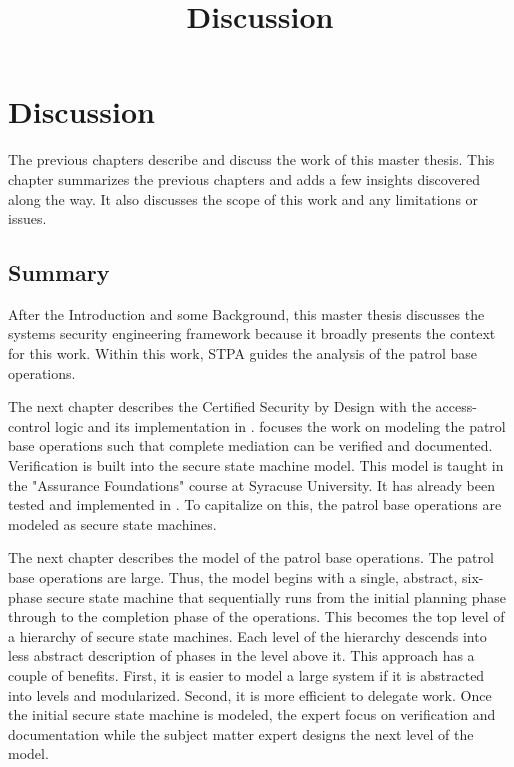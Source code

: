 \documentclass[../../main/main.tex]{subfiles}
\begin{document}
\title{Discussion}

\chapter{Discussion}\label{chp:discussion}

The previous chapters describe and discuss the work of this master thesis. This chapter summarizes the previous chapters and adds a few insights discovered along the way.  It also discusses the scope of this work and any limitations or issues.  

\section{Summary}\label{recap}
After the Introduction and some Background, this master thesis discusses the systems security engineering framework because it broadly presents the context for this work.  Within this work, STPA guides the analysis of the patrol base operations.

The next chapter describes the Certified Security by Design with the access-control logic and its implementation in .   focuses the work on modeling the patrol base operations such that complete mediation can be verified and documented.  Verification is built into the secure state machine model.  This model is taught in the "Assurance Foundations" course at Syracuse University.  It has already been tested and implemented in .  To capitalize on this, the patrol base operations are modeled as secure state machines.   

The next chapter describes the model of the patrol base operations.  The patrol base operations are large.  Thus, the model begins with a single, abstract, six-phase secure state machine that sequentially runs from the initial planning phase through to the completion phase of the operations.  This becomes the top level of a hierarchy of secure state machines.  Each level of the hierarchy descends into less abstract description of  phases in the level above it.  This approach has a couple of benefits.  First, it is easier to model a large system if it is abstracted into levels and modularized.  Second, it is more efficient to delegate work.  Once the initial secure state machine is modeled, the  expert focus on verification and documentation while the subject matter expert designs the next level of the model.
\end{document}
